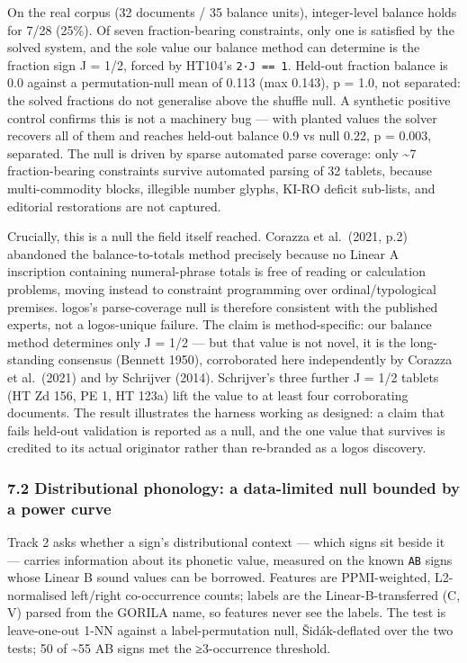 \documentclass[
  10pt,
]{article}
\begin{document}
On the real corpus (32 documents / 35 balance units), integer-level
balance holds for 7/28 (25\%). Of seven fraction-bearing constraints,
only one is satisfied by the solved system, and the sole value our
balance method can determine is the fraction sign J = 1/2, forced by
HT104's \texttt{2·J\ ==\ 1}. Held-out fraction balance is 0.0 against a
permutation-null mean of 0.113 (max 0.143), p = 1.0, not separated: the
solved fractions do not generalise above the shuffle null. A synthetic
positive control confirms this is not a machinery bug --- with planted
values the solver recovers all of them and reaches held-out balance 0.9
vs null 0.22, p = 0.003, separated. The null is driven by sparse
automated parse coverage: only \textasciitilde7 fraction-bearing
constraints survive automated parsing of 32 tablets, because
multi-commodity blocks, illegible number glyphs, KI-RO deficit
sub-lists, and editorial restorations are not captured.

Crucially, this is a null the field itself reached. Corazza et
al.~(2021, p.2) abandoned the balance-to-totals method precisely because
no Linear A inscription containing numeral-phrase totals is free of
reading or calculation problems, moving instead to constraint
programming over ordinal/typological premises. logos's parse-coverage
null is therefore consistent with the published experts, not a
logos-unique failure. The claim is method-specific: our balance method
determines only J = 1/2 --- but that value is not novel, it is the
long-standing consensus (Bennett 1950), corroborated here independently
by Corazza et al.~(2021) and by Schrijver (2014). Schrijver's three
further J = 1/2 tablets (HT Zd 156, PE 1, HT 123a) lift the value to at
least four corroborating documents. The result illustrates the harness
working as designed: a claim that fails held-out validation is reported
as a null, and the one value that survives is credited to its actual
originator rather than re-branded as a logos discovery.

\hypertarget{distributional-phonology-a-data-limited-null-bounded-by-a-power-curve}{%
\subsubsection{7.2 Distributional phonology: a data-limited null bounded
by a power
curve}\label{distributional-phonology-a-data-limited-null-bounded-by-a-power-curve}}

Track 2 asks whether a sign's distributional context --- which signs sit
beside it --- carries information about its phonetic value, measured on
the known \texttt{AB} signs whose Linear B sound values can be borrowed.
Features are PPMI-weighted, L2-normalised left/right co-occurrence
counts; labels are the Linear-B-transferred (C, V) parsed from the
GORILA name, so features never see the labels. The test is leave-one-out
1-NN against a label-permutation null, Šidák-deflated over the two
tests; 50 of \textasciitilde55 AB signs met the ≥3-occurrence threshold.
\end{document}
